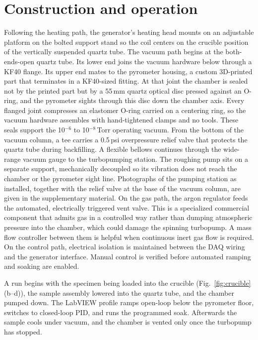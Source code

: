 \documentclass[%
 aip,
 rsi,%
 amsmath,amssymb,
 reprint,%
]{revtex4-2}
\begin{document}
\section{Construction and operation}

Following the heating path, the generator's heating head mounts on an
adjustable platform on the bolted support stand so the coil centers on the
crucible position of the vertically suspended quartz tube. The vacuum path
begins at the both-ends-open quartz tube. Its lower end joins
the vacuum hardware below through a KF40 flange. Its upper end mates to the
pyrometer housing, a custom 3D-printed part that terminates in a KF40-sized
fitting. At that joint the chamber is sealed not by the printed part but by
a 55\,mm quartz optical disc pressed against an O-ring, and the pyrometer
sights through this disc down the chamber axis. Every flanged joint compresses an elastomer
O-ring carried on a centering ring, so the vacuum hardware assembles with
hand-tightened clamps and no tools. These seals support the 10$^{-6}$ to
10$^{-8}$\,Torr operating vacuum. From the bottom of the vacuum column, a tee
carries a 0.5\,psi overpressure relief valve that protects the quartz tube
during backfilling. A flexible bellows continues through the wide-range
vacuum gauge to the turbopumping station. The roughing pump sits on a
separate support, mechanically decoupled so its vibration does not reach the
chamber or the pyrometer sight line. Photographs of the pumping station as
installed, together with the relief valve at the base of the vacuum column,
are given in the supplementary material. On the gas path, the argon regulator
feeds the automated, electrically triggered vent valve. This is a
specialized commercial component that admits gas in a controlled way rather
than dumping atmospheric pressure into the chamber, which could damage the
spinning turbopump. A mass flow controller between them is helpful
when continuous inert gas flow is required. On the control path, electrical
isolation is maintained between the DAQ wiring and the generator interface.
Manual control is verified before automated ramping and soaking are enabled.

A run begins with the specimen being loaded into the crucible
(Fig.~\ref{fig:crucible}(b--d)), the sample assembly lowered into the
quartz tube, and the chamber pumped down. The LabVIEW profile ramps open-loop below the pyrometer
floor, switches to closed-loop PID, and runs the programmed soak.
Afterwards the sample cools under vacuum, and the chamber is vented only
once the turbopump has stopped.
\end{document}
